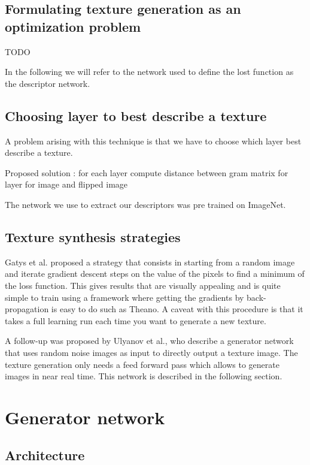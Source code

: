 \documentclass{article}
\begin{document}
\subsection{Formulating texture generation as an optimization problem}

TODO

In the following we will refer to the network used to define the lost function as the descriptor network.

\subsection{Choosing layer to best describe a texture}

A problem arising with this technique is that we have to choose which layer best describe a texture.

Proposed solution : for each layer compute distance between gram matrix for layer for image and flipped image

The network we use to extract our descriptors was pre trained on ImageNet. 

\subsection{Texture synthesis strategies}

Gatys et al. proposed a strategy that consists in starting from a random image and iterate gradient descent steps on the value of the pixels to find a minimum of the loss function. This gives results that are visually appealing and is quite simple to train using a framework where getting the gradients by back-propagation is easy to do such as Theano. A caveat with this procedure is that it takes a full learning run each time you want to generate a new texture.

A follow-up was proposed by Ulyanov et al., who describe a generator network that uses random noise images as input to directly output a texture image. The texture generation only needs a feed forward pass which allows to generate images in near real time. This network is described in the following section.



\section{Generator network}

\subsection{Architecture}
\end{document}
